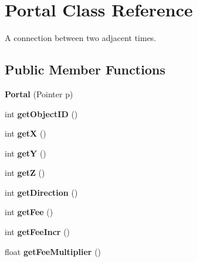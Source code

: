 \hypertarget{classPortal}{
\section{Portal Class Reference}
\label{classPortal}
}
A connection between two adjacent times.  


\subsection*{Public Member Functions}
\begin{CompactItemize}
\item 
\hypertarget{classPortal_8a2fffc0a245d244ee1cf6eb65107f9e}{
\textbf{Portal} (Pointer p)}
\label{classPortal_8a2fffc0a245d244ee1cf6eb65107f9e}

\item 
\hypertarget{classPortal_0d9df749602425a10f502ea98e3cbf4d}{
int \textbf{getObjectID} ()}
\label{classPortal_0d9df749602425a10f502ea98e3cbf4d}

\item 
\hypertarget{classPortal_fe44ea5cfb6974808bc6fbf88d68f1cb}{
int \textbf{getX} ()}
\label{classPortal_fe44ea5cfb6974808bc6fbf88d68f1cb}

\item 
\hypertarget{classPortal_9749e055cf67bdb4a2fa997d699159ca}{
int \textbf{getY} ()}
\label{classPortal_9749e055cf67bdb4a2fa997d699159ca}

\item 
\hypertarget{classPortal_93d3e9605a606799ad5a87e39d11b980}{
int \textbf{getZ} ()}
\label{classPortal_93d3e9605a606799ad5a87e39d11b980}

\item 
\hypertarget{classPortal_2e5b1b9179301f214059b9c3e55ad422}{
int \textbf{getDirection} ()}
\label{classPortal_2e5b1b9179301f214059b9c3e55ad422}

\item 
\hypertarget{classPortal_865eb443eed6e1c82f5743092d54c488}{
int \textbf{getFee} ()}
\label{classPortal_865eb443eed6e1c82f5743092d54c488}

\item 
\hypertarget{classPortal_77a19a4968e415556805a1076eaab7c4}{
int \textbf{getFeeIncr} ()}
\label{classPortal_77a19a4968e415556805a1076eaab7c4}

\item 
\hypertarget{classPortal_2da131e32757e31d9d9e101c0a5b870d}{
float \textbf{getFeeMultiplier} ()}
\label{classPortal_2da131e32757e31d9d9e101c0a5b870d}

\end{CompactItemize}
